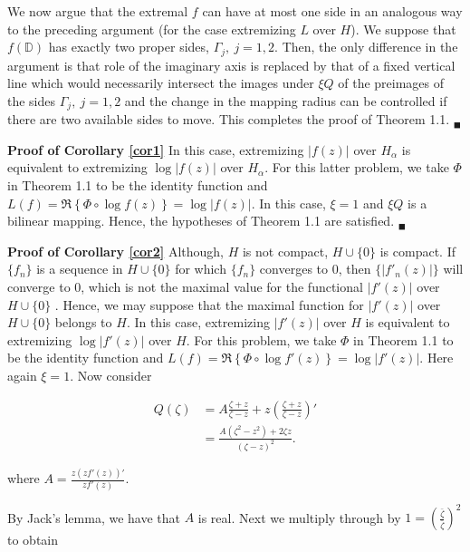 \documentclass[final]{siamltex}
\newcommand{\dsp}{\displaystyle}
\newcommand{\D}{\mathbb{D}}
\begin{document}
We now argue that the extremal $f$ can have at most one side in an analogous way to the preceding argument (for the case extremizing $L$ over $H$).  We suppose that $f(\D)$ has exactly two proper sides, $\Gamma_j, \ j=1,2$. Then, the only difference in the argument is that role of the imaginary axis is replaced by that of a fixed vertical line which would necessarily intersect the images under $\xi Q$ of the preimages of the sides $\Gamma_j, \ j=1,2$ and the change in the mapping radius can be controlled if there are two available sides to move.  This completes the proof of Theorem 1.1. $_\blacksquare$


\vspace{0.1in}   

\noindent \textbf{Proof of Corollary \ref{cor1}}  In this case, extremizing $|f(z)|$ over $H_{\alpha}$ is equivalent to extremizing $\log |f(z)|$ over $H_{\alpha}$.  For this latter problem, we take $\Phi$ in Theorem 1.1 to be the identity function and  $L(f) =  \Re \left\{ \Phi \circ \log f(z) \right\} = \log |f(z)|$.  In this case, $\xi = 1$ and $\xi Q$ is a bilinear mapping.  Hence, the hypotheses of Theorem 1.1 are satisfied. $_\blacksquare$

\vspace{0.1in}   

\noindent \textbf{Proof of Corollary \ref{cor2}} Although, $H$ is not compact, $H \cup \{0\}$ is compact.  If $\{f_n\}$ is a sequence in $H \cup \{0\}$ for which $\{f_n\}$ converges to $0$, then $\{|f'_{n}(z)|\}$ will converge to $0$, which is not the maximal value for the functional $|f'(z)|$ over $H\cup \{0\}$ .  Hence, we may suppose that the maximal function for $|f'(z)|$ over $H\cup \{0\}$  belongs to $H$.  In this case, extremizing $|f'(z)|$ over $H$ is equivalent to extremizing $\log |f'(z)|$ over $H$.  For this problem, we take $\Phi$ in Theorem 1.1 to be the identity function and  $L(f) =  \Re \left\{ \Phi \circ \log f'(z) \right\} = \log |f'(z)|$.  Here again $\xi = 1$.  Now consider 

\begin{align*}
Q(\zeta) &= A \frac{\zeta +z}{\zeta-z} + z\left( \frac{\zeta +z}{\zeta-z} \right ) '\\
&=\frac{ A (\zeta^2 - z^2 ) + 2 \zeta z }{(\zeta - z)^2}.
\end{align*}

\noindent where ${\dsp A = \frac{z (zf'(z))'}{zf'(z)}}$.

By Jack's lemma, we have that $A$ is real.  Next we multiply through by $\dsp{1 = \left( \frac{\bar{\zeta}}{\bar{\zeta}} \right) ^2}$ to obtain
\end{document}
